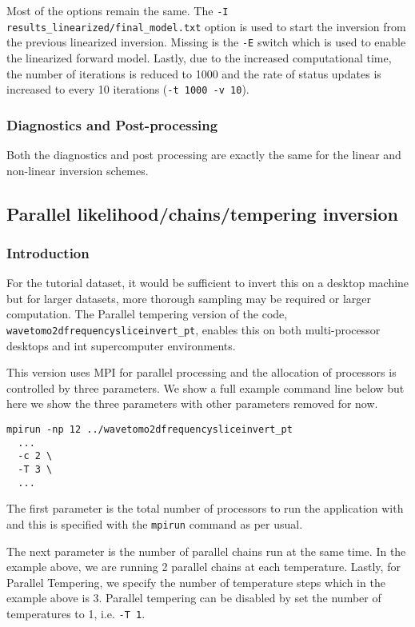 \documentclass[a4paper,12pt]{article}
\begin{document}
Most of the options remain the same. The {\tt -I
  results\_linearized/final\_model.txt} option is used to start the
inversion from the previous linearized inversion.  Missing is the
{\tt -E} switch which is used to enable the linearized forward model.
Lastly, due to the increased computational time, the number of
iterations is reduced to 1000 and the rate of status updates is
increased to every 10 iterations ({\tt -t 1000 -v 10}).

\subsubsection{Diagnostics and Post-processing}

Both the diagnostics and post processing are exactly the same for
the linear and non-linear inversion schemes.

\subsection{Parallel likelihood/chains/tempering inversion}

\subsubsection{Introduction}

For the tutorial dataset, it would be sufficient to invert this on a
desktop machine but for larger datasets, more thorough sampling may be
required or larger computation. The Parallel tempering version of the
code, {\tt wavetomo2dfrequencysliceinvert\_pt}, enables this on both
multi-processor desktops and int supercomputer environments.

This version uses MPI for parallel processing and the allocation
of processors is controlled by three parameters. We show a full
example command line below but here we show the three parameters
with other parameters removed for now.

\begin{verbatim}
mpirun -np 12 ../wavetomo2dfrequencysliceinvert_pt 
  ...
  -c 2 \
  -T 3 \
  ...
\end{verbatim}

The first parameter is the total number of processors to run
the application with and this is specified with the {\tt mpirun}
command as per usual.

The next parameter is the number of parallel chains run at the
same time. In the example above, we are running 2 parallel chains
at each temperature. Lastly, for Parallel Tempering, we
specify the number of temperature steps which in the example above
is 3. Parallel tempering can be disabled by set the number of
temperatures to 1, i.e. {\tt -T 1}.
\end{document}
